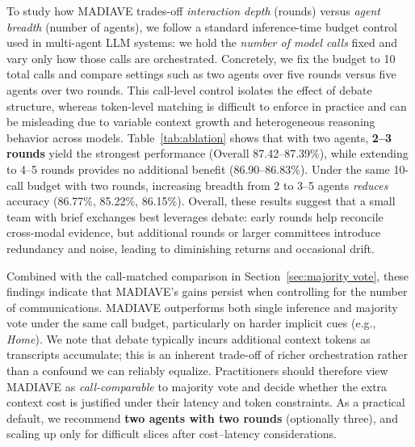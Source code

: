 \documentclass[11pt]{article}
\newcommand{\modelname}{MADIAVE}
\begin{document}
To study how \textsc{\modelname} trades-off \emph{interaction depth} (rounds) versus \emph{agent breadth} (number of agents), we follow a standard inference-time budget control used in multi-agent LLM systems: we hold the \emph{number of model calls} fixed and vary only how those calls are orchestrated. Concretely, we fix the budget to 10 total calls and compare settings such as two agents over five rounds versus five agents over two rounds. This call-level control isolates the effect of debate structure, whereas token-level matching is difficult to enforce in practice and can be misleading due to variable context growth and heterogeneous reasoning behavior across models. Table~\ref{tab:ablation} shows that with two agents, \textbf{2--3 rounds} yield the strongest performance (Overall 87.42--87.39\%), while extending to 4--5 rounds provides no additional benefit (86.90--86.83\%). Under the same 10-call budget with two rounds, increasing breadth from 2 to 3--5 agents \emph{reduces} accuracy (86.77\%, 85.22\%, 86.15\%). Overall, these results suggest that a small team with brief exchanges best leverages debate: early rounds help reconcile cross-modal evidence, but additional rounds or larger committees introduce redundancy and noise, leading to diminishing returns and occasional drift.


Combined with the call-matched comparison in Section~\ref{sec:majority vote}, these findings indicate that \textsc{\modelname}'s gains persist when controlling for the number of communications. \textsc{\modelname} outperforms both single inference and majority vote under the same call budget, particularly on harder implicit cues (e.g., \emph{Home}). We note that debate typically incurs additional context tokens as transcripts accumulate; this is an inherent trade-off of richer orchestration rather than a confound we can reliably equalize. Practitioners should therefore view \textsc{\modelname} as \emph{call-comparable} to majority vote and decide whether the extra context cost is justified under their latency and token constraints. As a practical default, we recommend \textbf{two agents with two rounds} (optionally three), and scaling up only for difficult slices after cost--latency considerations.


\end{document}
